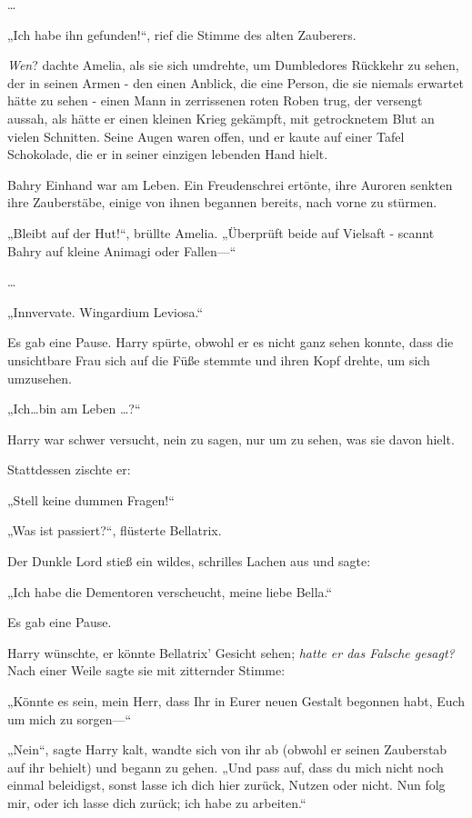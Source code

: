 {…

„Ich habe ihn gefunden!“, rief die Stimme des alten Zauberers.

\emph{Wen}? dachte Amelia, als sie sich umdrehte, um Dumbledores Rückkehr zu sehen, der in seinen Armen - den einen Anblick, die eine Person, die sie niemals erwartet hätte zu sehen - einen Mann in zerrissenen roten Roben trug, der versengt aussah, als hätte er einen kleinen Krieg gekämpft, mit getrocknetem Blut an vielen Schnitten. Seine Augen waren offen, und er kaute auf einer Tafel Schokolade, die er in seiner einzigen lebenden Hand hielt.

Bahry Einhand war am Leben. Ein Freudenschrei ertönte, ihre Auroren senkten ihre Zauberstäbe, einige von ihnen begannen bereits, nach vorne zu stürmen.

„Bleibt auf der Hut!“, brüllte Amelia. „Überprüft beide auf Vielsaft - scannt Bahry auf kleine Animagi oder Fallen—“

…

„Innvervate. Wingardium Leviosa.“

Es gab eine Pause. Harry spürte, obwohl er es nicht ganz sehen konnte, dass die unsichtbare Frau sich auf die Füße stemmte und ihren Kopf drehte, um sich umzusehen.

„Ich…bin am Leben …?“

Harry war schwer versucht, nein zu sagen, nur um zu sehen, was sie davon hielt.

Stattdessen zischte er:

„Stell keine dummen Fragen!“

„Was ist passiert?“, flüsterte Bellatrix.

Der Dunkle Lord stieß ein wildes, schrilles Lachen aus und sagte:

„Ich habe die Dementoren verscheucht, meine liebe Bella.“

Es gab eine Pause.

Harry wünschte, er könnte Bellatrix' Gesicht sehen; \emph{hatte er das Falsche gesagt?} Nach einer Weile sagte sie mit zitternder Stimme:

„Könnte es sein, mein Herr, dass Ihr in Eurer neuen Gestalt begonnen habt, Euch um mich zu sorgen—“

„Nein“, sagte Harry kalt, wandte sich von ihr ab (obwohl er seinen Zauberstab auf ihr behielt) und begann zu gehen. „Und pass auf, dass du mich nicht noch einmal beleidigst, sonst lasse ich dich hier zurück, Nutzen oder nicht. Nun folg mir, oder ich lasse dich zurück; ich habe zu arbeiten.“

}
